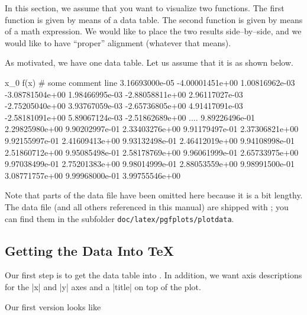 
In this section, we assume that you want to visualize two functions. The first function is given by means of a data table. The second function is given by means of a math expression. We would like to place the two results side--by--side, and we would like to have ``proper'' alignment (whatever that means).

As motivated, we have one data table. Let us assume that it is as shown below.
\begin{codeexample}
x_0	f(x)
# some comment line
3.16693000e-05	-4.00001451e+00
1.00816962e-03	-3.08781504e+00
1.98466995e-03	-2.88058811e+00
2.96117027e-03	-2.75205040e+00
3.93767059e-03	-2.65736805e+00
4.91417091e-03	-2.58181091e+00
5.89067124e-03	-2.51862689e+00
....
9.89226496e-01	2.29825980e+00
9.90202997e-01	2.33403276e+00
9.91179497e-01	2.37306821e+00
9.92155997e-01	2.41609413e+00
9.93132498e-01	2.46412019e+00
9.94108998e-01	2.51860712e+00
9.95085498e-01	2.58178769e+00
9.96061999e-01	2.65733975e+00
9.97038499e-01	2.75201383e+00
9.98014999e-01	2.88053559e+00
9.98991500e-01	3.08771757e+00
9.99968000e-01	3.99755546e+00
\end{codeexample}
Note that parts of the data file have been omitted here because it is a bit lengthy. The data file (and all others referenced in this manual) are shipped with \PGFPlots; you can find them in the subfolder \texttt{doc/latex/pgfplots/plotdata}.

\subsection{Getting the Data Into \TeX}
\label{sec:tut1:step1}
Our first step is to get the data table into \PGFPlots. In addition, we want axis descriptions for the |x| and |y| axes and a |title| on top of the plot.

Our first version looks like
\begin{codeexample}[]

%

%
\end{codeexample}

